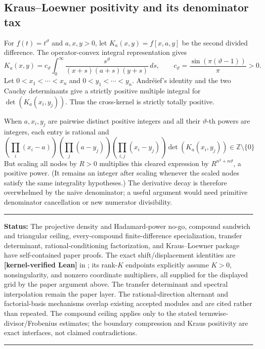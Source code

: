 \documentclass[11pt,oneside]{article}
\theoremstyle{definition}
\theoremstyle{remark}
\newcommand{\Z}{\mathbb Z}
\newcommand{\thetaq}{\vartheta}
\newcommand{\lean}[1]{\texttt{\detokenize{#1}}}
\newcommand{\statuslean}{\textcolor{leanblue}{\textbf{[kernel-verified Lean]}}}
\newenvironment{statusbox}[1]
{\begin{center}\begin{minipage}{0.94\textwidth}\raggedright\hbadness=10000\hrule
\vspace{0.45em}\textbf{Status:} #1\par\vspace{0.35em}}
{\vspace{0.35em}\hrule\end{minipage}\end{center}}
\begin{document}
\subsection{Kraus--Loewner positivity and its denominator tax}
\label{mx:kraus}

For $f(t)=t^{\thetaq}$ and $a,x,y>0$, let $K_a(x,y)=f[x,a,y]$ be the second divided
difference.  The operator-convex integral representation gives
\begin{equation}
 K_a(x,y)=c_{\thetaq}\int_0^\infty
 \frac{s^{\thetaq}}{(x+s)(a+s)(y+s)}\,ds,
 \qquad c_{\thetaq}=\frac{\sin(\pi(\thetaq-1))}{\pi}>0.
 \label{mx:eq-kraus-kernel}
\end{equation}
Let $0<x_1<\cdots<x_n$ and $0<y_1<\cdots<y_n$.  Andr\'eief's identity and the two Cauchy determinants
give a strictly positive multiple integral for $\det(K_a(x_i,y_j))$.  Thus the cross-kernel
is strictly totally positive.

When $a,x_i,y_j$ are pairwise distinct positive integers and all their $\thetaq$-th powers
are integers, each entry is rational and
\begin{equation}
 \left(\prod_i(x_i-a)\right)
 \left(\prod_j(a-y_j)\right)
 \left(\prod_{i,j}(x_i-y_j)\right)
 \det(K_a(x_i,y_j))\in\Z\setminus\{0\}
 \label{mx:eq-kraus-clearing}
\end{equation}
But scaling all nodes by $R>0$ multiplies this cleared expression by
$R^{n^2+n\thetaq}$, a positive power.  (It remains an integer after scaling whenever the
scaled nodes satisfy the same integrality hypotheses.)  The derivative decay is therefore overwhelmed by the
naive denominator; a useful argument would need primitive denominator cancellation or new
numerator divisibility.

\begin{statusbox}{The projective density and Hadamard-power no-go, compound sandwich and
triangular ceiling, every-compound finite-difference specialization, transfer determinant,
rational-conditioning factorization, and Kraus--Loewner package have self-contained paper
proofs.  The exact shift/displacement identities are \statuslean{} in
\lean{BoundaryDisplacement}; its rank-$K$ endpoints explicitly assume $K>0$, nonsingularity,
and nonzero coordinate multipliers, all supplied for the displayed grid by the paper argument
above.  The
transfer determinant and spectral interpolation remain the paper layer.  The rational-direction
alternant and factorial-basis mechanisms overlap existing
accepted modules and are cited rather than repeated.  The compound ceiling applies only to the stated
termwise-divisor/Frobenius estimates; the boundary compression and Kraus positivity are exact
interfaces, not claimed contradictions.}
\end{statusbox}
\end{document}

